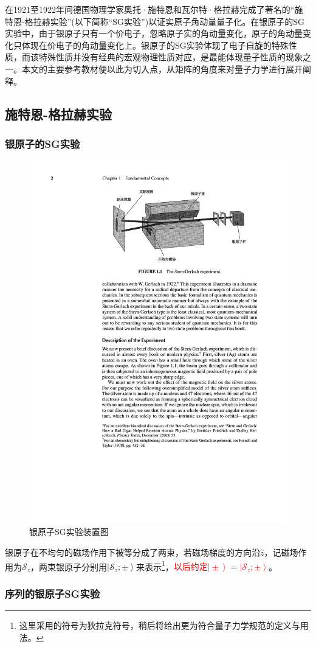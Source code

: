 \documentclass[UTF8,12pt]{article}
\providecommand\Ket[1]{\left|\right. #1 \left.\right\rangle}
\numberwithin{equation}{subsection}
\providecommand{\empR}[1]{\textcolor{red}{#1}}
\begin{document}
	在1921至1922年间德国物理学家奥托·施特恩和瓦尔特·格拉赫完成了著名的“施特恩-格拉赫实验”(以下简称“SG实验”)以证实原子角动量量子化。在银原子的SG实验中，由于银原子只有一个价电子，忽略原子实的角动量变化，原子的角动量变化只体现在价电子的角动量变化上。银原子的SG实验体现了电子自旋的特殊性质，而该特殊性质并没有经典的宏观物理性质对应，是最能体现量子性质的现象之一。本文的主要参考教材\parencite{sakurai1995modern}便以此为切入点，从矩阵的角度来对量子力学进行展开阐释。
	\newpage
	\subsection{施特恩-格拉赫实验}
	\subsubsection{银原子的SG实验}
	\begin{figure}[H]
		\centering
		\includegraphics[width=0.4\linewidth]{SGe.pdf}
		\caption{银原子SG实验装置图}
	\end{figure}
	
	银原子在不均匀的磁场作用下被等分成了两束，若磁场梯度的方向沿$\hat z$，记磁场作用为$\mathcal S_z$，两束银原子分别用$\Ket{\mathcal S_z;\pm}$来表示\footnote{这里采用的符号为狄拉克符号，稍后将给出更为符合量子力学规范的定义与用法。}，\empR{以后约定$\Ket{\pm}=\Ket{\mathcal S_z;\pm}$}。
	
	\subsubsection{序列的银原子SG实验}
	
\end{document}
